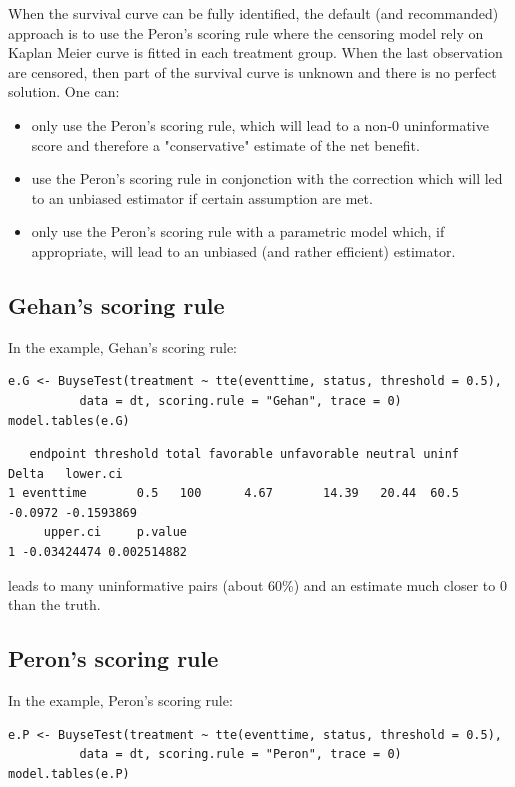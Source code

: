 \documentclass[12pt]{article}
\begin{document}
When the survival curve can be fully identified, the default (and
recommanded) approach is to use the Peron's scoring rule where the
censoring model rely on Kaplan Meier curve is fitted in each treatment
group. When the last observation are censored, then part of the
survival curve is unknown and there is no perfect solution. One can:
\begin{itemize}
\item only use the Peron's scoring rule, which will lead to a non-0
uninformative score and therefore a "conservative" estimate of the net benefit.
\item use the Peron's scoring rule in conjonction with the correction
which will led to an unbiased estimator if certain assumption are met.
\item only use the Peron's scoring rule with a parametric model which, if
appropriate, will lead to an unbiased (and rather efficient)
estimator.
\end{itemize}

\subsection{Gehan's scoring rule}
\label{sec:orgc122e58}
In the example, Gehan's scoring rule:
\lstset{language=r,label= ,caption= ,captionpos=b,numbers=none}
\begin{lstlisting}
e.G <- BuyseTest(treatment ~ tte(eventtime, status, threshold = 0.5),
          data = dt, scoring.rule = "Gehan", trace = 0)
model.tables(e.G)
\end{lstlisting}

\begin{verbatim}
   endpoint threshold total favorable unfavorable neutral uninf   Delta   lower.ci
1 eventtime       0.5   100      4.67       14.39   20.44  60.5 -0.0972 -0.1593869
     upper.ci     p.value
1 -0.03424474 0.002514882
\end{verbatim}


leads to many uninformative pairs (about 60\%) and an estimate much
closer to 0 than the truth.

\subsection{Peron's scoring rule}
\label{sec:org4c9dc06}
In the example, Peron's scoring rule:
\lstset{language=r,label= ,caption= ,captionpos=b,numbers=none}
\begin{lstlisting}
e.P <- BuyseTest(treatment ~ tte(eventtime, status, threshold = 0.5),
          data = dt, scoring.rule = "Peron", trace = 0)
model.tables(e.P)
\end{lstlisting}
\end{document}
